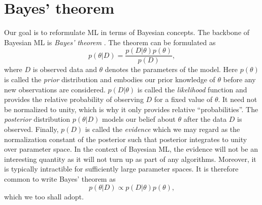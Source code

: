 \section{Bayes' theorem}
Our goal is to reformulate ML in terms of Bayesian concepts. The backbone of Bayesian ML
is \textit{Bayes' theorem} \cite{bayes_theorem}. The theorem can be formulated as
\begin{equation}
	p(\theta | D) = \frac{p(D|\theta)p(\theta)}{p(D)},
\end{equation}
where $D$ is observed data and $\theta$ denotes the parameters of the model.
Here $p(\theta)$ is called the \textit{prior} distribution and embodies our prior knowledge of $\theta$ before any new observations are considered. 
$p(D|\theta)$ is called the \textit{likelihood} function and provides the relative probability  
of observing $D$ for a fixed value of $\theta$. It need not be normalized to unity, which is why it only provides relative ``probabilities''.
The \textit{posterior} distribution $p(\theta|D)$ models our belief about $\theta$ after the data $D$ is observed. 
Finally, $p(D)$ is called the \textit{evidence} which we may regard as the normalization constant of the posterior
such that posterior integrates to unity over parameter space.
In the context of Bayesian ML, the evidence will not be an interesting quantity as it will not
turn up as part of any algorithms. Moreover, it is typically intractible for sufficiently large parameter spaces.
It is therefore common to write Bayes' theorem as 
\begin{equation}\label{eq:bayes_theorem}
  p(\theta|D) \propto p(D|\theta)p(\theta),
\end{equation}
which we too shall adopt.

